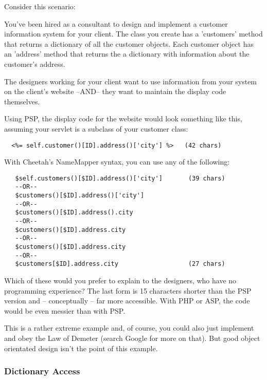 Consider this scenario:

You've been hired as a consultant to design and implement a customer information
system for your client. The class you create has a 'customers' method that
returns a dictionary of all the customer objects.  Each customer object has an
'address' method that returns the a dictionary with information about the
customer's address.

The designers working for your client want to use information from your system
on the client's website --AND-- they want to maintain the display code
themselves.

Using PSP, the display code for the website would look something like this,
assuming your servlet is a subclass of your customer class:


\begin{verbatim}
  <%= self.customer()[ID].address()['city'] %>   (42 chars)
\end{verbatim}

With Cheetah's NameMapper syntax, you can use any of the following:

\begin{verbatim}
   $self.customers()[$ID].address()['city']       (39 chars)
   --OR--                                         
   $customers()[$ID].address()['city']           
   --OR--                                         
   $customers()[$ID].address().city              
   --OR--                                         
   $customers()[$ID].address.city                
   --OR--                                         
   $customers()[$ID].address.city
   --OR--
   $customers[$ID].address.city                   (27 chars)                     
\end{verbatim}   

Which of these would you prefer to explain to the designers, who have no
programming experience?  The last form is 15 characters shorter than the PSP
version and -- conceptually -- far more accessible. With PHP or ASP, the
code would be even messier than with PSP.

This is a rather extreme example and, of course, you could also just implement
 and obey the Law of Demeter (search Google for more
on that).  But good object orientated design isn't the point of this example.

\subsubsection{Dictionary Access}
\label{language.namemapper.dict}

